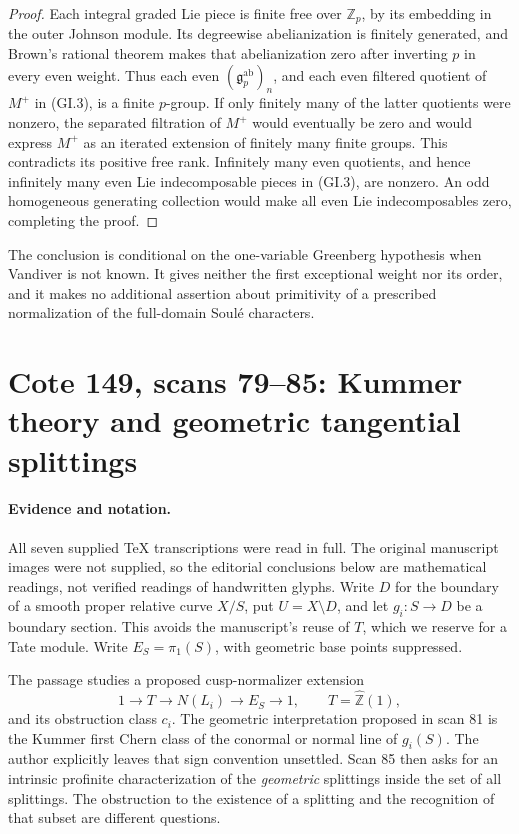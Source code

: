 \documentclass[11pt,a4paper]{article}
\theoremstyle{definition}
\begin{document}
\begin{proof}
Each integral graded Lie piece is finite free over $\mathbb Z_p$,
by its embedding in the outer Johnson module.  Its degreewise
abelianization is finitely generated, and Brown's rational theorem
makes that abelianization zero after inverting $p$ in every even
weight.  Thus each even $(\mathfrak g_p^{\mathrm{ab}})_n$, and
each even filtered quotient of $M^+$ in (GI.3), is a finite
$p$-group.  If only finitely many of the latter quotients were
nonzero, the separated filtration of $M^+$ would eventually
be zero and would express $M^+$ as an iterated extension of
finitely many finite groups.  This contradicts its positive
free rank.  Infinitely many even quotients, and hence infinitely
many even Lie indecomposable pieces in (GI.3), are nonzero.
An odd homogeneous generating collection would make all even
Lie indecomposables zero, completing the proof.
\end{proof}

The conclusion is conditional on the one-variable Greenberg hypothesis
when Vandiver is not known.  It gives neither the first exceptional
weight nor its order, and it makes no additional assertion about
primitivity of a prescribed normalization of the full-domain
Soul\'e characters.

\section{Cote 149, scans 79--85: Kummer theory and geometric tangential splittings}
\label{sec:archive-kummer}

\paragraph{Evidence and notation.}
All seven supplied TeX transcriptions were read in full.  The original
manuscript images were not supplied, so the editorial conclusions below are
mathematical readings, not verified readings of handwritten glyphs.  Write
\(D\) for the boundary of a smooth proper relative curve \(X/S\), put
\(U=X\setminus D\), and let \(g_i:S\longrightarrow D\) be a boundary section.
This avoids the manuscript's reuse of \(T\), which we reserve for a Tate module.
Write \(E_S=\pi_1(S)\), with geometric base points suppressed.

The passage studies a proposed cusp-normalizer extension
\begin{equation}\label{eq:arc-normalizer}
 1\longrightarrow T\longrightarrow N(L_i)
   \longrightarrow E_S\longrightarrow 1,
 \qquad T=\widehat{\mathbb Z}(1),
\end{equation}
and its obstruction class \(c_i\).  The geometric interpretation proposed in
scan 81 is the Kummer first Chern class of the conormal or normal line of
\(g_i(S)\).  The author explicitly leaves that sign convention unsettled.
Scan 85 then asks for an intrinsic profinite characterization of the
\emph{geometric} splittings inside the set of all splittings.  The obstruction
to the existence of a splitting and the recognition of that subset are
different questions.
\end{document}
